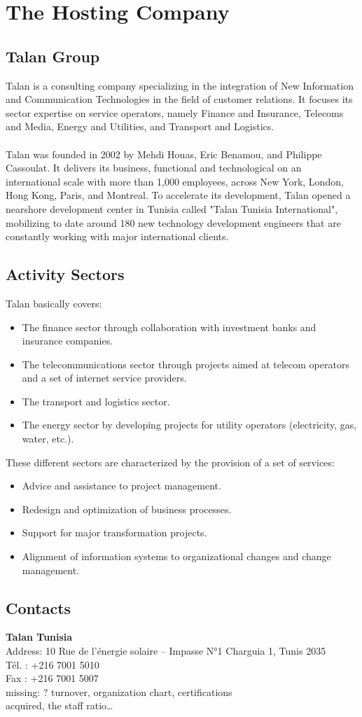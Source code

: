 \chapter{The Hosting Company}




\section{Talan Group}
Talan is a consulting company specializing in the integration of New Information and Communication Technologies in the field of customer relations. It focuses its sector expertise on service operators, namely Finance and Insurance, Telecoms and Media, Energy and Utilities, and Transport and Logistics.
\\
\\
Talan was founded in 2002 by Mehdi Houas, Eric Benamou, and Philippe Cassoulat. It delivers its business, functional and technological on an international scale with more than 1,000 employees, across New York, London, Hong Kong, Paris, and Montreal. To accelerate its development, Talan opened a nearshore development center in Tunisia called "Talan Tunisia International", mobilizing to date around 180 new technology development engineers that are constantly working with major international clients.
\\

\section{Activity Sectors}
Talan basically covers:
\begin{itemize}
    \item The finance sector through collaboration with investment banks and insurance companies.
    \item The telecommunications sector through projects aimed at telecom operators and a set of internet service providers.
    \item The transport and logistics sector.
    \item The energy sector by developing projects for utility operators (electricity, gas, water, etc.).
\end{itemize}
These different sectors are characterized by the provision of a set of services:
\begin{itemize}
    \item Advice and assistance to project management.
    \item Redesign and optimization of business processes.
    \item Support for major transformation projects.
    \item Alignment of information systems to organizational changes and change management.
\end{itemize}

\section{Contacts}
\textbf{Talan Tunisia} \\
Address: 10 Rue de l’énergie solaire – Impasse N°1 Charguia 1, 
Tunis 2035 \\
Tél. : +216 7001 5010 \\
Fax : +216 7001 5007 \\

missing: 
? turnover, organization chart, certifications \\
acquired, the staff ratio… 

